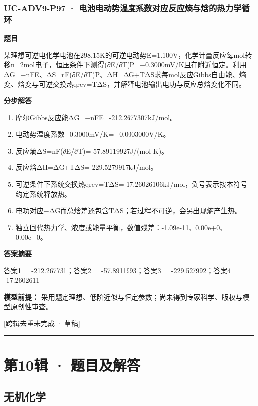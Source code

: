 \documentclass[UTF8,11pt,a4paper]{ctexart}
\begin{document}
\subsubsection*{UC-ADV9-P97 · 电池电动势温度系数对应反应熵与焓的热力学循环}
\noindent\textbf{题目}\par
某理想可逆电化学电池在298.15K的可逆电动势E=1.100V，化学计量反应每mol转移n=2mol电子，恒压条件下测得(∂E/∂T)P=−0.3000mV/K且在附近恒定。利用ΔG=−nFE、ΔS=nF(∂E/∂T)P、ΔH=ΔG+TΔS求每mol反应Gibbs自由能、熵变、焓变与可逆交换热qrev=TΔS，并解释电池输出电功与反应总焓变化不同。\par
\medskip\noindent\textbf{分步解答}
\begin{enumerate}
\item 摩尔Gibbs反应能ΔG=−nFE=-212.2677307kJ/mol。
\item 电动势温度系数−0.3000mV/K=−0.0003000V/K。
\item 反应熵ΔS=nF(∂E/∂T)=-57.89119927J/(mol K)。
\item 反应焓ΔH=ΔG+TΔS=-229.5279917kJ/mol。
\item 可逆条件下系统交换热qrev=TΔS=-17.26026106kJ/mol，负号表示按本符号约定系统释放热。
\item 电功对应−ΔG而总焓差还包含TΔS；若过程不可逆，会另出现熵产生热。
\item 独立回代热力学、浓度或能量平衡，数值残差：-1.09e-11、0.00e+0、0.00e+0。
\end{enumerate}
\noindent\textbf{答案摘要}\par
答案1 = -212.267731；答案2 = -57.8911993；答案3 = -229.527992；答案4 = -17.2602611\par
\noindent\textbf{模型前提：}
采用题定理想、低阶近似与恒定参数；尚未得到专家科学、版权与模型原创性审查。\par
\noindent\textcolor{red!65!black}{[跨辑去重未完成 · 草稿]} \par
\medskip\hrule\medskip
\clearpage
\section*{第10辑 · 题目及解答}
\subsection*{无机化学}
\end{document}
